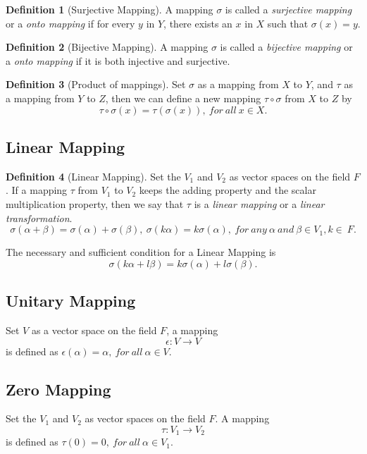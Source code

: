 \documentclass{article}
\theoremstyle{definition}
\newtheorem{defi}{Definition}[section]
\begin{document}
\begin{defi}[Surjective Mapping]
    A mapping $\sigma$ is called a \textit{surjective mapping} or a \textit{onto mapping}
    if for every $y$ in $Y$, there exists an $x$ in $X$ such that $\sigma(x)=y$.
\end{defi}

\begin{defi}[Bijective Mapping]
    A mapping $\sigma$ is called a \textit{bijective mapping} or a \textit{onto mapping}
    if it is both injective and surjective.
\end{defi}

\begin{defi}[Product of mappings]
    Set $\sigma$ as a mapping from $X$ to $Y$, and $\tau$ as a mapping from $Y$ to $Z$, 
    then we can define a new mapping $\tau\circ\sigma$ from $X$ to $Z$ by
    $$\tau\circ\sigma(x)=\tau(\sigma(x)),\ for\ all\ x\in X.$$
\end{defi}

\subsection{Linear Mapping}
\begin{defi}[Linear Mapping]
    Set the $V_{1}$ and $V_{2}$ as vector spaces on the field $F$. 
    If a mapping $\tau$ from $V_{1}$ to $V_{2}$ keeps the adding property and the scalar 
    multiplication property, then we say that $\tau$ is a \textit{linear mapping} or a
    \textit{linear transformation}.
    $$\sigma (\alpha + \beta) = \sigma (\alpha) + \sigma (\beta),\ \sigma (k\alpha)=k\sigma (\alpha),\ for\ any\ \alpha\ and\ \beta\in V_{1},k\in \ F.$$
\end{defi}

The necessary and sufficient condition for a Linear Mapping is 
$$\sigma (k\alpha +l\beta) = k\sigma(\alpha)+l\sigma(\beta).$$

\subsection{Unitary Mapping}
Set $V$ as a vector space on the field $F$, a mapping $$\epsilon:V\rightarrow V$$
is defined as $\epsilon (\alpha)=\alpha,\ for\ all\ \alpha\in V.$
\subsection{Zero Mapping}
Set the $V_{1}$ and $V_{2}$ as vector spaces on the field $F$.
A mapping $$\tau :V_{1}\rightarrow V_{2}$$ 
is defined as $\tau (0)=0,\ for\ all\ \alpha\in V_{1}.$
\end{document}
